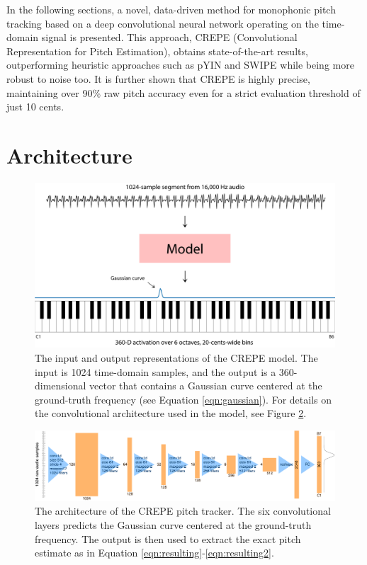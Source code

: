 In the following sections, a novel, data-driven method for monophonic pitch tracking based on a deep convolutional neural network operating on the time-domain signal is presented.
This approach, CREPE (Convolutional  Representation  for  Pitch  Estimation), obtains state-of-the-art results, outperforming heuristic approaches such as pYIN and SWIPE while being more robust to noise too.
It is further shown that CREPE is highly precise, maintaining over 90\% raw pitch accuracy even for a strict evaluation threshold of just 10 cents.

\section{Architecture}

\begin{figure}
	\centering
	\includegraphics[width=0.9\linewidth]{formulation.pdf}
	\caption{The input and output representations of the CREPE model. The input is 1024 time-domain samples, and the output is a 360-dimensional vector that contains a Gaussian curve centered at the ground-truth frequency (see Equation \ref{eqn:gaussian}). For details on the convolutional architecture used in the model, see Figure \ref{fig:architecture}.}\label{fig:formulation}
\end{figure}

\begin{figure}
	\includegraphics[width=\textwidth]{architecture.pdf}
	\caption{The architecture of the CREPE pitch tracker. The six convolutional layers predicts the Gaussian curve centered at the ground-truth frequency. The output is then used to extract the exact pitch estimate as in Equation \ref{eqn:resulting}-\ref{eqn:resulting2}.}
	\label{fig:architecture}
\end{figure}

